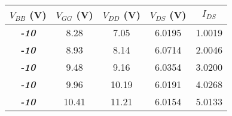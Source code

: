 \begin{tabular}{@{}ccccc@{}}
\toprule
\textbf{$V_{BB}$ (V)} & \multicolumn{1}{l}{\textbf{$V_{GG}$ (V)}} & \textbf{$V_{DD}$ (V)} & \textbf{$V_{DS}$ (V)} & \textbf{$I_{DS}$} \\ \midrule
\textit{\textbf{-10}}     & 8.28      & 7.05      & 6.0195      & 1.0019      \\
\textit{\textbf{-10}}     & 8.93      & 8.14      & 6.0714      & 2.0046      \\
\textit{\textbf{-10}}     & 9.48      & 9.16      & 6.0354       & 3.0200      \\
\textit{\textbf{-10}}     & 9.96      & 10.19      & 6.0191      & 4.0268      \\
\textit{\textbf{-10}}     & 10.41      &  11.21     &  6.0154     & 5.0133      \\ \bottomrule
\end{tabular}